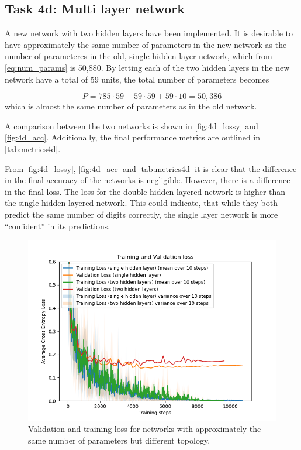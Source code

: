 \documentclass{article}
\begin{document}
\subsection{Task 4d: Multi layer network}
A new network with two hidden layers have been implemented. It is desirable to have approximately the same number of parameters in the new network as the number of parameteres in the old, single-hidden-layer network, which from \eqref{eq:num_params} is 50,880. By letting each of the two hidden layers in the new network have a total of 59 units, the total number of parameters becomes

\begin{equation}
    P = 785 \cdot 59 + 59 \cdot 59 + 59 \cdot 10 = 50,386
\end{equation}
which is almost the same number of parameters as in the old network.


A comparison between the two networks is shown in \autoref{fig:4d_lossy} and \autoref{fig:4d_acc}. Additionally, the final performance metrics are outlined in \autoref{tab:metrics4d}.


From \autoref{fig:4d_lossy}, \autoref{fig:4d_acc} and \autoref{tab:metrics4d} it is clear that the difference in the final accuracy of the networks is negligible. However, there is a difference in the final loss. The loss for the double hidden layered network is higher than the single hidden layered network. This could indicate, that while they both predict the same number of digits correctly, the single layer network is more ``confident'' in its predictions.

\begin{figure}[H]
    \centering
    \includegraphics[width=\textwidth]{Assignments/Assignment_2/plots/task4/task4d_loss.png}
    \caption{Validation and training loss for networks with approximately the same number of parameters but different topology.}
    \label{fig:4d_lossy}
\end{figure}
\end{document}
